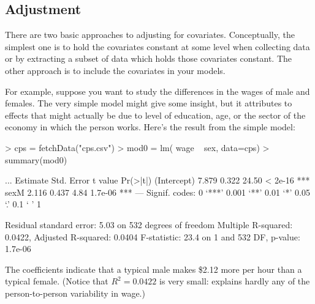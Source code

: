


\subsection{Adjustment}


There are two basic approaches to adjusting for covariates.
Conceptually, the simplest one is to hold the covariates constant at
some level when collecting data or by extracting a subset of data
which holds those covariates constant.  The other approach is to
include the covariates in your models.

For example, suppose you want
to study the differences in the wages of male and females.  The very
simple model  might give some insight, but
it attributes to  effects that might actually be due to level
of education, age, or the sector of the economy in which the person
works.  Here's the result from the simple model:\datasetCPS
\begin{Schunk}
\begin{Sinput}
> cps = fetchData("cps.csv")
> mod0 = lm( wage ~ sex, data=cps)
> summary(mod0)
\end{Sinput}
\begin{Soutput}
...
            Estimate Std. Error t value Pr(>|t|)    
(Intercept)    7.879      0.322   24.50  < 2e-16 ***
sexM           2.116      0.437    4.84  1.7e-06 ***
---
Signif. codes:  0 ‘***’ 0.001 ‘**’ 0.01 ‘*’ 0.05 ‘.’ 0.1 ‘ ’ 1 

Residual standard error: 5.03 on 532 degrees of freedom
Multiple R-squared: 0.0422,	Adjusted R-squared: 0.0404 
F-statistic: 23.4 on 1 and 532 DF,  p-value: 1.7e-06 
\end{Soutput}
\end{Schunk}
The coefficients indicate that a typical male makes \$2.12 more per
hour than a typical female.  (Notice that $R^2 = 0.0422$ is very small:
 explains hardly any of the person-to-person variability in wage.)

